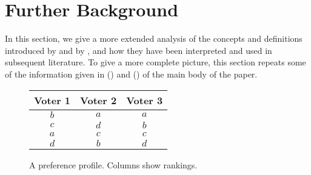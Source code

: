 \section{Further Background}\label{appsec:bg}
In this section, we give a more extended analysis of the concepts and definitions introduced by \citet{Tideman87:Independence} and by \citet{Laffond96:Composition}, and how they have been interpreted and used in subsequent literature. To give a more complete picture, this section repeats some of the information given in  () and  () of the main body of the paper.

\begin{figure}[b]
\centering \begin{tabular}{|c|c|c|}
  \hline
  Voter 1 & Voter 2 & Voter 3\\ \hline 
  \cellcolor{blue!25} $b$ & \cellcolor{yellow!25}  $a$ &\cellcolor{yellow!25} $a$ \\
  \hline
\cellcolor{green!25} $c$ &  \cellcolor{red!25} $d$ &\cellcolor{blue!25} $b$ \\
  \hline
      \cellcolor{yellow!25} $a$ & \cellcolor{green!25} $c$ & \cellcolor{green!25} $c$  \\
  \hline
     \cellcolor{red!25} $d$ & \cellcolor{blue!25} $b$ &\cellcolor{red!25} $d$ \\
  \hline
\end{tabular}
\caption{A preference profile. Columns show rankings.}\label{fig:appeg_prof}
\end{figure} 

